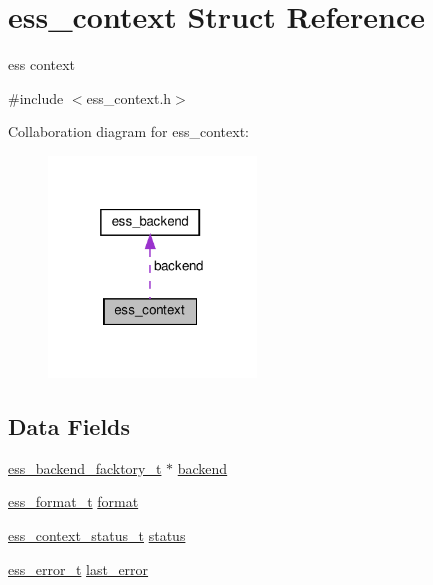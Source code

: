 \hypertarget{structess__context}{}\section{ess\+\_\+context Struct Reference}
\label{structess__context}


ess context  




{\ttfamily \#include $<$ess\+\_\+context.\+h$>$}



Collaboration diagram for ess\+\_\+context\+:\nopagebreak
\begin{figure}[H]
\begin{center}
\leavevmode
\includegraphics[width=157pt]{dd/d8d/structess__context__coll__graph}
\end{center}
\end{figure}
\subsection*{Data Fields}
\begin{DoxyCompactItemize}
\item 
\hyperlink{ess__backend_8h_ab1487f8c501b38b66796d0fbecb7ed7b}{ess\+\_\+backend\+\_\+facktory\+\_\+t} $\ast$ \hyperlink{structess__context_a1fdb06c6d95c1f47d692da94aaf8af17}{backend}
\item 
\hyperlink{ess__format_8h_a9aa23f58a25b9e8360c1400e0cadfd80}{ess\+\_\+format\+\_\+t} \hyperlink{structess__context_abb4395d1c05d3bbc2e1d011507ddd19b}{format}
\item 
\hyperlink{ess__context_8h_adb5314cbbcb2bed6fc8b770d8ef3257c}{ess\+\_\+context\+\_\+status\+\_\+t} \hyperlink{structess__context_a6151ccede5aaf683375710d2677c74c7}{status}
\item 
\hyperlink{ess__error_8h_a08ab97fcf6745dee67de912e41bd3236}{ess\+\_\+error\+\_\+t} \hyperlink{structess__context_aa6eab2e06cfd939fe9cbb74e3395520a}{last\+\_\+error}
\end{DoxyCompactItemize}


